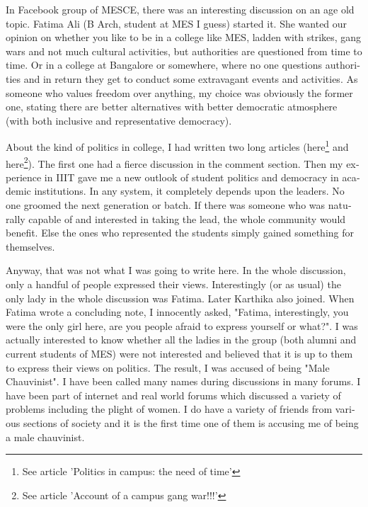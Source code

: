 \begin{english}
\vskip 2pt
In Facebook group of MESCE, there was an interesting discussion on an age old topic. 
Fatima Ali (B Arch, student at MES I guess) started it. She wanted our opinion on whether 
you like to be in a college like MES, ladden with strikes, gang wars and not much cultural 
activities, but authorities are questioned from time to time. Or in a college at Bangalore 
or somewhere, where no one questions authorities and in return they get to conduct some 
extravagant events and activities. As someone who values freedom over anything, my 
choice was obviously the former one, stating there are better alternatives with better 
democratic atmosphere (with both inclusive and representative democracy).

About the kind of politics in college, I had written two long articles (here\footnote{See article 'Politics in campus: the need of time'} 
and here\footnote{See article 'Account of a campus gang war!!!'}). The first one had a fierce discussion in the comment section. 
Then my experience in IIIT gave me a new outlook of student politics and democracy in academic institutions. 
In any system, it completely depends upon the leaders. No one groomed the next generation or batch. If there 
was someone who was naturally capable of and interested in taking the lead, the whole community would 
benefit. Else the ones who represented the students simply gained something for themselves.

Anyway, that was not what I was going to write here. In the whole discussion, only a handful of people 
expressed their views. Interestingly (or as usual) the only lady in the whole discussion was Fatima. Later 
Karthika also joined. When Fatima wrote a concluding note, I innocently asked, "Fatima, interestingly, you 
were the only girl here, are you people afraid to express yourself or what?". I was actually interested to 
know whether all the ladies in the group (both alumni and current students of MES) were not interested 
and believed that it is up to them to express their views on politics. The result, I was accused of being 
"Male Chauvinist". I have been called many names during discussions in many forums. I have been 
part of internet and real world forums which discussed a variety of problems including the plight of 
women. I do have a variety of friends from various sections of society and it is the first time one of 
them is accusing me of being a male chauvinist.


\end{english}
